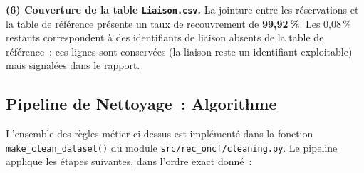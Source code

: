 \documentclass[11pt, a4paper]{article}
\begin{document}
\textbf{(6) Couverture de la table \texttt{Liaison.csv}.} La jointure
entre les réservations et la table de référence présente un taux de
recouvrement de \textbf{99{,}92\,\%}. Les 0{,}08\,\% restants
correspondent à des identifiants de liaison absents de la table de
référence~; ces lignes sont conservées (la liaison reste un identifiant
exploitable) mais signalées dans le rapport.

\subsection{Pipeline de Nettoyage~: Algorithme}

L'ensemble des règles métier ci-dessus est implémenté dans la fonction
\texttt{make\_clean\_dataset()} du module
\texttt{src/rec\_oncf/cleaning.py}. Le pipeline applique les étapes
suivantes, dans l'ordre exact donné~:
\end{document}
